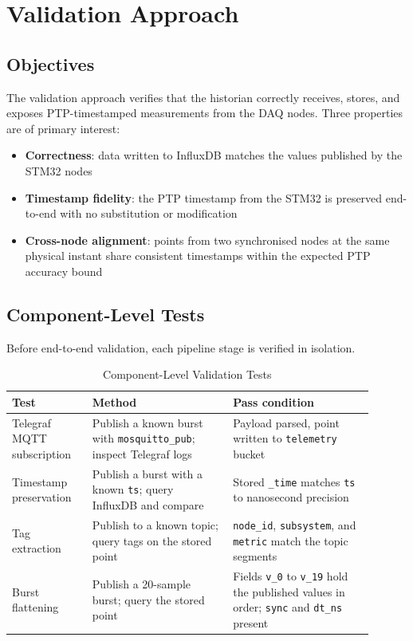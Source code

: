 \section{Validation Approach}

\subsection{Objectives}
The validation approach verifies that the historian correctly receives, stores, and exposes PTP-timestamped measurements from the DAQ nodes. Three properties are of primary interest:

\begin{itemize}[noitemsep]
    \item \textbf{Correctness}: data written to InfluxDB matches the values published by the STM32 nodes
    \item \textbf{Timestamp fidelity}: the PTP timestamp from the STM32 is preserved end-to-end with no substitution or modification
    \item \textbf{Cross-node alignment}: points from two synchronised nodes at the same physical instant share consistent timestamps within the expected PTP accuracy bound
\end{itemize}

\subsection{Component-Level Tests}
Before end-to-end validation, each pipeline stage is verified in isolation.

\begin{table}[H]
\centering
\caption{Component-Level Validation Tests}
\begin{tabular}{p{0.2\linewidth}p{0.35\linewidth}p{0.35\linewidth}}
\hline
\textbf{Test} & \textbf{Method} & \textbf{Pass condition} \\
\hline
Telegraf MQTT subscription & Publish a known burst with \texttt{mosquitto\_pub}; inspect Telegraf logs & Payload parsed, point written to \texttt{telemetry} bucket \\
Timestamp preservation & Publish a burst with a known \texttt{ts}; query InfluxDB and compare & Stored \texttt{\_time} matches \texttt{ts} to nanosecond precision \\
Tag extraction & Publish to a known topic; query tags on the stored point & \texttt{node\_id}, \texttt{subsystem}, and \texttt{metric} match the topic segments \\
Burst flattening & Publish a 20-sample burst; query the stored point & Fields \texttt{v\_0} to \texttt{v\_19} hold the published values in order; \texttt{sync} and \texttt{dt\_ns} present \\
\hline
\end{tabular}
\end{table}

